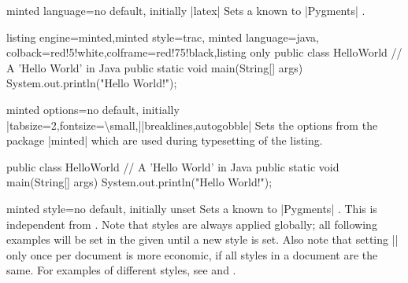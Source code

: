 \begin{docTcbKey}{minted language}{=}{no default, initially |latex|}
Sets a  known to |Pygments| \cite{pygments:web}.
\begin{dispExample}
\begin{tcblisting}{listing engine=minted,minted style=trac,
  minted language=java,
  colback=red!5!white,colframe=red!75!black,listing only}
    public class HelloWorld {
      // A 'Hello World' in Java
      public static void main(String[] args) {
        System.out.println("Hello World!");
      }
    }
\end{tcblisting}
\end{dispExample}
\end{docTcbKey}


\begin{docTcbKey}[][doc updated={2017-07-05}]{minted options}{=}{no default, initially
    |tabsize=2,fontsize=\textbackslash small,|\linebreak|breaklines,autogobble|}
  Sets the options from the package |minted| \cite{poore:minted}
  which are used during typesetting of the listing.
\begin{dispExample}

\begin{myjava}
  public class HelloWorld {
    // A 'Hello World' in Java
    public static void main(String[] args) {
      System.out.println("Hello World!");
    }
  }
\end{myjava}
\end{dispExample}
\end{docTcbKey}

\clearpage
\begin{docTcbKey}{minted style}{=}{no default, initially unset}
Sets a  known to |Pygments| \cite{pygments:web}. This is
independent from . Note that styles are always
applied globally; all following examples will be set in the given 
until a new style is set. Also note that
setting |\usemintedstyle| only once per document is more economic, if
all styles in a document are the same.
For examples of different styles, see
 and .
\end{docTcbKey}

